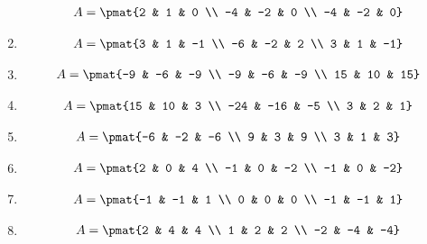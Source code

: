 \begin{enumerate}
\begin{align*}
A = \pmat{2 & 1 & 0 \\ -4 & -2 & 0 \\ -4 & -2 & 0}
\end{align*}

\item

\begin{align*}
A = \pmat{3 & 1 & -1 \\ -6 & -2 & 2 \\ 3 & 1 & -1}
\end{align*}

\item

\begin{align*}
A = \pmat{-9 & -6 & -9 \\ -9 & -6 & -9 \\ 15 & 10 & 15}
\end{align*}

\item

\begin{align*}
A = \pmat{15 & 10 & 3 \\ -24 & -16 & -5 \\ 3 & 2 & 1}
\end{align*}

\item

\begin{align*}
A = \pmat{-6 & -2 & -6 \\ 9 & 3 & 9 \\ 3 & 1 & 3}
\end{align*}

\item

\begin{align*}
A = \pmat{2 & 0 & 4 \\ -1 & 0 & -2 \\ -1 & 0 & -2}
\end{align*}

\item

\begin{align*}
A = \pmat{-1 & -1 & 1 \\ 0 & 0 & 0 \\ -1 & -1 & 1}
\end{align*}

\item

\begin{align*}
A = \pmat{2 & 4 & 4 \\ 1 & 2 & 2 \\ -2 & -4 & -4}
\end{align*}


\end{enumerate}
